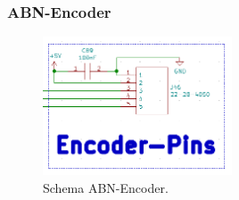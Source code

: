 \subsubsection{ABN-Encoder}
\label{subsubsec:ABN-Encoder}

\begin{figure}[h!]
	\centering
	\includegraphics[width=0.5\textwidth]{graphics/Schema_ABN_Encoder}
	\caption{Schema ABN-Encoder.}
	\label{fig:Schema_ABN_Encoder}
\end{figure} 
